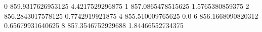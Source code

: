 0 859.9317626953125 4.4217529296875
1 857.0865478515625 1.5765380859375
2 856.2843017578125 0.7742919921875
4 855.510009765625 0.0
6 856.1668090820312 0.65679931640625
8 857.3546752929688 1.84466552734375
